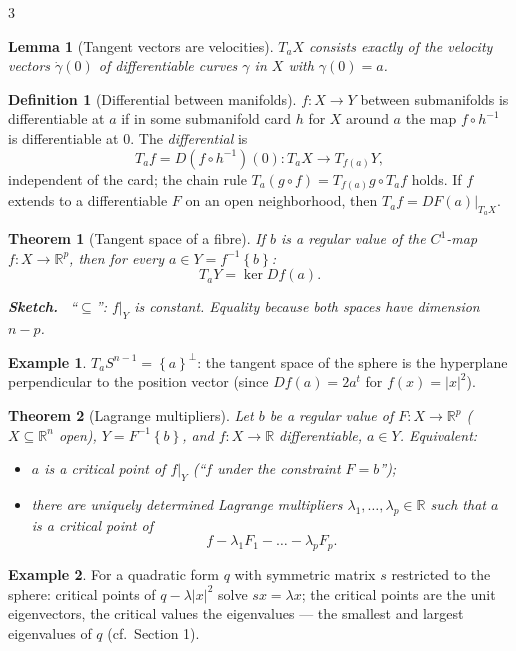 \documentclass[10pt,a4paper,landscape]{article}
\theoremstyle{definition}
\newtheorem{defn}{Definition}[section]
\newtheorem{exm}{Example}[section]
\theoremstyle{plain}
\newtheorem{thm}{Theorem}[section]
\newtheorem{lem}{Lemma}[section]
\theoremstyle{remark}
\newcommand{\R}{\mathbb{R}}
\newcommand{\abs}[1]{\lvert #1 \rvert}
\newcommand{\set}[1]{\left\{ #1 \right\}}
\newcommand{\comp}{\circ}
\newcommand{\restr}[2]{#1|_{#2}}
\newenvironment{proofsketch}{%
  \par\small\color{exgray}\textbf{Sketch.}\ }%
  {\par}
\begin{document}
\begin{multicols*}{3}
\begin{lem}[Tangent vectors are velocities]
$T_a X$ consists exactly of the velocity vectors $\dot\gamma(0)$ of differentiable curves $\gamma$ in $X$ with $\gamma(0) = a$.
\end{lem}

\begin{defn}[Differential between manifolds]
$f: X \to Y$ between submanifolds is differentiable at $a$ if in some submanifold card $h$ for $X$ around $a$ the map $f \comp h^{-1}$ is differentiable at $0$. The \emph{differential} is
\[
T_a f = D(f \comp h^{-1})(0): T_a X \to T_{f(a)} Y ,
\]
independent of the card; the chain rule $T_a(g \comp f) = T_{f(a)}g \comp T_a f$ holds. If $f$ extends to a differentiable $F$ on an open neighborhood, then $T_a f = DF(a)\big|_{T_a X}$.
\end{defn}

\begin{thm}[Tangent space of a fibre]
If $b$ is a regular value of the $C^1$-map $f: X \to \R^p$, then for every $a \in Y = f^{-1}\set{b}$:
\[
T_a Y = \ker Df(a) .
\]
\begin{proofsketch}
``$\subseteq$'': $f|_Y$ is constant. Equality because both spaces have dimension $n - p$.
\end{proofsketch}
\end{thm}

\begin{exm}
$T_a S^{n-1} = \set{a}^{\bot}$: the tangent space of the sphere is the hyperplane perpendicular to the position vector (since $Df(a) = 2a^t$ for $f(x) = \abs{x}^2$).
\end{exm}

\begin{thm}[Lagrange multipliers]
Let $b$ be a regular value of $F: X \to \R^p$ ($X \subseteq \R^n$ open), $Y = F^{-1}\set{b}$, and $f: X \to \R$ differentiable, $a \in Y$. Equivalent:
\begin{itemize}
\item $a$ is a critical point of $\restr{f}{Y}$ (``$f$ under the constraint $F = b$'');
\item there are uniquely determined \emph{Lagrange multipliers} $\lambda_1, \dots, \lambda_p \in \R$ such that $a$ is a critical point of
\[
f - \lambda_1 F_1 - \dots - \lambda_p F_p .
\]
\end{itemize}
\end{thm}

\begin{exm}
For a quadratic form $q$ with symmetric matrix $s$ restricted to the sphere: critical points of $q - \lambda\abs{x}^2$ solve $sx = \lambda x$; the critical points are the unit eigenvectors, the critical values the eigenvalues --- the smallest and largest eigenvalues of $q$ (cf.\ Section 1).
\end{exm}


\end{multicols*}
\end{document}

